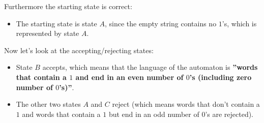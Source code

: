 Furthermore the starting state is correct:
\begin{itemize}
    \item The starting state is state $A$, since the empty string contains no $1$'s, which is represented by state $A$.
\end{itemize}

Now let's look at the accepting/rejecting states:

\begin{itemize}
    \item State $B$ accepts, which means that the language of the automaton is \textbf{''words that contain a $1$ and end in an even number of $0$'s (including zero number of $0$'s)''}.
    \item The other two states $A$ and $C$ reject (which means words that don't contain a $1$ and words that contain a $1$ but end in an odd number of $0$'s are rejected).
\end{itemize}